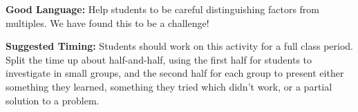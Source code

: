 \documentclass{ximera}
\begin{document}
\begin{instructorNotes}
{\bf Good Language:} Help students to be careful distinguishing factors from multiples. We have found this to be a challenge!



{\bf Suggested Timing:} Students should work on this activity for a full class period. Split the time up about half-and-half, using the first half for students to investigate in small groups, and the second half for each group to present either something they learned, something they tried which didn't work, or a partial solution to a problem.

\end{instructorNotes}
\end{document}

